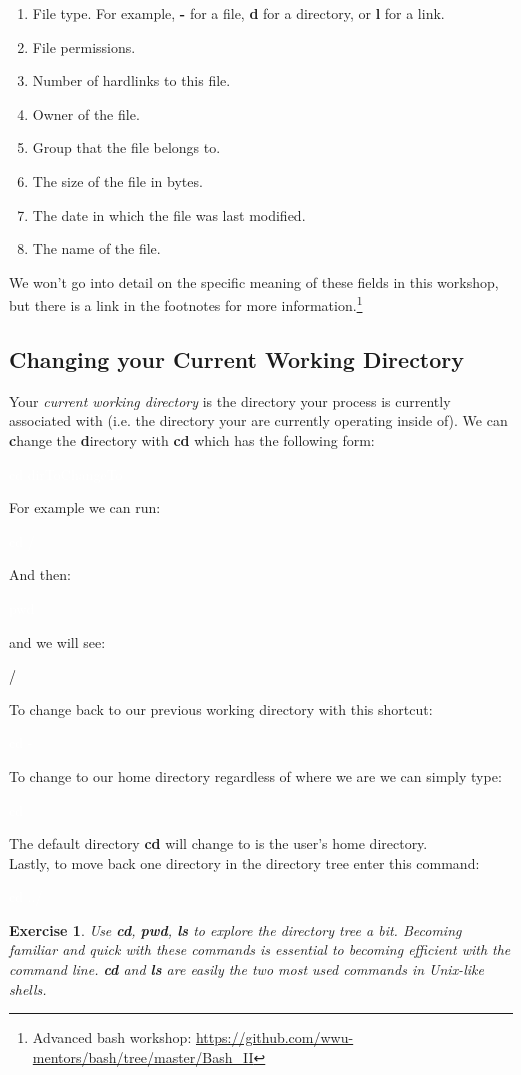 \documentclass[oneside]{book}
\newcommand{\commandline}[1]{\begin{center} \colorbox{Dark}{\textcolor{white}{#1}} \end{center}}
\newcommand{\exampleout}[1]{\begin{center} \colorbox{Light}{\textcolor{black}{#1}} \end{center}}
\newtheorem{ex}{Exercise}[chapter]
\begin{document}
\begin{enumerate}
    \item File type. For example, \textbf{-} for a file, \textbf{d} for a directory, or \textbf{l} for a link.
    \item File permissions. 
    \item Number of hardlinks to this file.
    \item Owner of the file.
    \item Group that the file belongs to.
    \item The size of the file in bytes.
    \item The date in which the file was last modified.
    \item The name of the file.
\end{enumerate}

We won't go into detail on the specific meaning of these fields in this workshop, but there is a link in the footnotes for more information.\footnote{Advanced bash workshop: \url{https://github.com/wwu-mentors/bash/tree/master/Bash_II}}
	
\subsection{Changing your Current Working Directory}
 Your \textit{current working directory} is the directory your process is currently associated with (i.e. the directory your are currently operating inside of). We can \textbf{c}hange the \textbf{d}irectory with \textbf{cd} which has the following form:

\commandline{cd dirToChangeTo}
For example we can run:
\commandline{cd /}
And then:
\commandline{pwd}
and we will see:
\exampleout{/}
To change back to our previous working directory with this shortcut:
\commandline{cd -}
To change to our home directory regardless of where we are we can simply type:
\commandline{cd}
The default directory \textbf{cd} will change to is the user's home directory. \\
Lastly, to move back one directory in the directory tree enter this command:
\commandline{cd ../}

\begin{ex}
	Use \textbf{cd}, \textbf{pwd}, \textbf{ls} to explore the directory tree a bit. Becoming familiar and quick with these commands is essential to becoming efficient with the command line. \textbf{cd} and \textbf{ls} are easily the two most used commands in Unix-like shells.
\end{ex}
\end{document}
